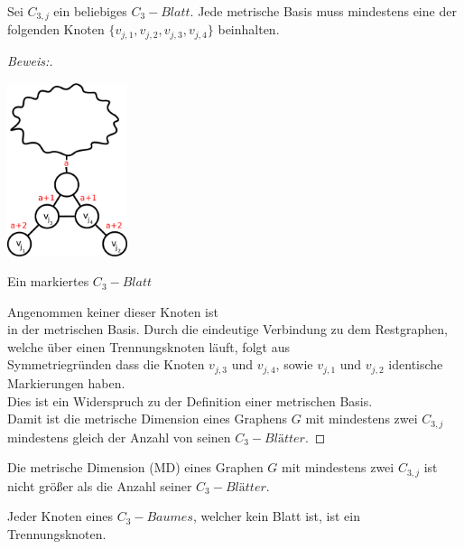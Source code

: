 \newpage
\begin{lem}
Sei $C_{3,j}$ ein beliebiges $C_{3}-Blatt$. Jede metrische Basis muss mindestens eine der folgenden Knoten $\{v_{j,1},v_{j,2},v_{j,3},v_{j,4}\}$ beinhalten.
\end{lem}
\begin{proof}[Beweis:]~
\par
\vspace{-2mm}
\begin{floatingfigure}[l]{200pt}
{\flushleft
\hspace*{1.7cm}
\includegraphics[width=100pt]{bilder/beweis.pdf}}
\caption{Ein markiertes $C_{3}-Blatt$}
\end{floatingfigure}
Angenommen keiner dieser Knoten ist\\in der metrischen Basis. Durch die eindeutige Verbindung zu dem Restgraphen, welche über einen Trennungsknoten läuft, folgt aus\\Symmetriegründen dass die Knoten $v_{j,3}$ und $v_{j,4}$, sowie $v_{j,1}$ und $v_{j,2}$ identische Markierungen haben.\\Dies ist ein Widerspruch zu der Definition einer metrischen Basis.\\
Damit ist die metrische Dimension eines Graphens $G$ mit mindestens zwei $C_{3,j}$\\mindestens gleich der Anzahl von seinen $C_{3}-Blätter$.
\end{proof}
\par
\vspace{+3mm}
\begin{lem}
Die metrische Dimension (MD) eines Graphen $G$ mit mindestens zwei $C_{3,j}$ ist nicht größer als die Anzahl seiner $C_{3}-Blätter$. 
\end{lem}
\begin{lem}
\label{bkb}
Jeder Knoten eines $C_{3}-Baumes$, welcher kein Blatt ist, ist ein Trennungsknoten.
\end{lem}


